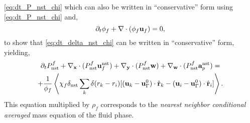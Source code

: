 \ref{eq:dt_P_nst_chi} which can also be written in ``conservative'' form using \ref{eq:dt_P_nst_chi} and, 
\begin{equation}
    \partial_t \phi_f 
    + \mathbf{\nabla}\cdot(
        \phi_f
        \textbf{u}_f 
        ) 
    = 0, 
\end{equation}
to show that \ref{eq:dt_delta_nst_chi} can be written in ``conservative'' form, yielding, 
\begin{multline}
    \pddt P_\text{nst}^f
    + 
    \pddx \cdot (
        P_\text{nst}^f
        \textbf{u}_f^\text{nst}
    )
    + \pddy \cdot (
        P_\text{nst}^f
        \textbf{w}
    )
    +
    \pddw \cdot (  
        P_\text{nst}^f
        \textbf{a}_p^\text{nst} 
    )
    = \\
    + \frac{1}{\phi_f}\avg{
     \chi_f \delta_\text{nst}
    \sum_k 
    \delta(r_k - r_i)
    [(\textbf{u}_k - \textbf{u}_\Gamma^0) \cdot \hat{\textbf{r}}_k - (\textbf{u}_i- \textbf{u}_\Gamma^0)  \cdot \hat{\textbf{r}}_i]}.
    \label{eq:dt_Pc_nst_chi}
\end{multline}
This equation multiplied by $\rho_f$ corresponds to the \textit{nearest neighbor conditional averaged} mass equation of the fluid phase. 

